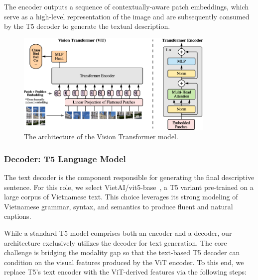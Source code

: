 The encoder outputs a sequence of contextually-aware patch embeddings, which serve as a high-level representation of the image and are subsequently consumed by the T5 decoder to generate the textual description.

\begin{figure}
  \centering
  \includegraphics[width=0.85\textwidth]{image/ViT-architecture.png}
  \caption{The architecture of the Vision Transformer model.}
  \label{fig:ViT-architecture}
\end{figure}

\subsubsection{Decoder: T5 Language Model}

The text decoder is the component responsible for generating the final descriptive sentence. For this role, we select VietAI/vit5-base~\cite{phan-etal-2022-vit5}, a T5 variant pre-trained on a large corpus of Vietnamese text. This choice leverages its strong modeling of Vietnamese grammar, syntax, and semantics to produce fluent and natural captions.

While a standard T5 model comprises both an encoder and a decoder, our architecture exclusively utilizes the decoder for text generation. The core challenge is bridging the modality gap so that the text-based T5 decoder can condition on the visual features produced by the ViT encoder. To this end, we replace T5's text encoder with the ViT-derived features via the following steps:

